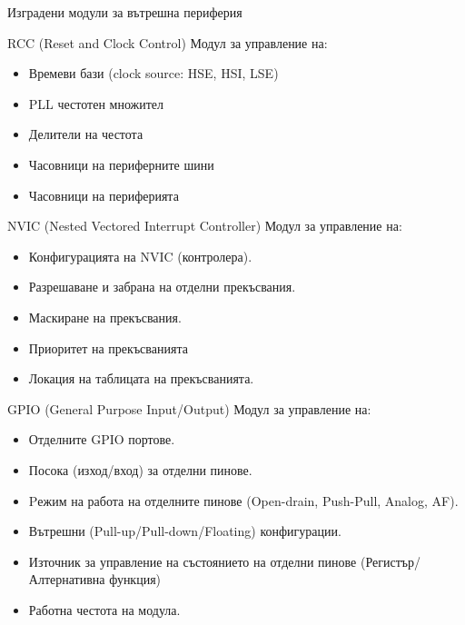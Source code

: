\documentclass{beamer}
\begin{document}
\begin{frame}{Изградени модули за вътрешна периферия}
	\pause
	\begin{block}{RCC (Reset and Clock Control)}
		\pause
		Модул за управление на:
		\begin{itemize}
			\pause
			\item Времеви бази (clock source: HSE, HSI, LSE)
			\pause
			\item PLL честотен множител
			\pause
			\item Делители на честота
			\pause
			\item Часовници на периферните шини
			\pause
			\item Часовници на периферията
		\end{itemize}
	\end{block}

\end{frame}

\begin{frame}[t]
	\pause
	\begin{block}{NVIC (Nested Vectored Interrupt Controller)}
		\pause
		Модул за управление на:
		\begin{itemize}
			\pause
			\item Конфигурацията на NVIC (контролера).
			\pause
			\item Разрешаване и забрана на отделни прекъсвания.
			\pause
			\item Маскиране на прекъсвания.
			\pause
			\item Приоритет на прекъсванията
			\pause
			\item Локация на таблицата на прекъсванията.
		\end{itemize}
	\end{block}

\end{frame}

\begin{frame}[t]
	\pause
	\begin{block}{GPIO (General Purpose Input/Output)}
		\pause
		Модул за управление на:
		 \begin{itemize}
			\pause
			\item Отделните GPIO портове.
			\pause
			\item Посока (изход/вход) за отделни пинове.
			\pause
			\item Pежим на работа на отделните пинове (Open-drain, Push-Pull, Analog, AF).
			\pause
			\item Вътрешни (Pull-up/Pull-down/Floating) конфигурации.
			\pause
			 \item Източник за управление на състоянието на отделни пинове (Регистър/Алтернативна функция)
			 \pause
			  \item Работна честота на модула.
	 	\end{itemize}
	\end{block}

\end{frame}
\end{document}
